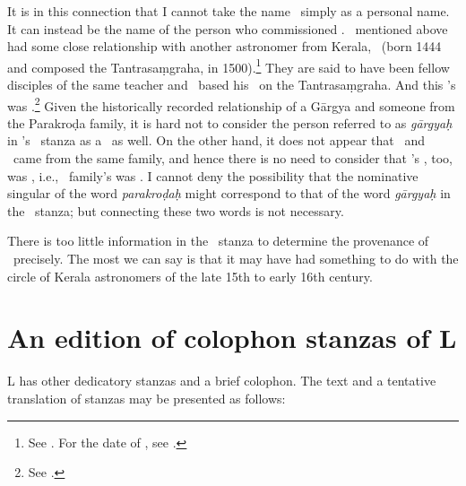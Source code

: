 It is in this connection that I cannot take the name \Gargya\ simply as a personal name. It can instead be the \gotra{} name of the person who commissioned \Tm. \Jyesthadeva\ mentioned above had some close relationship with another astronomer from Kerala, \NilakanthaSomayaji\ (born 1444 and composed the Tantrasaṃgraha, in 1500).\footnote{See \citet[187–8]{kvsarma:1991}. For the date of \NilakanthaSomayaji, see \citet[S 3]{sarmaandnarasimhan:tantrasangraha}.} They are said to have been fellow disciples of the same teacher and \Jyesthadeva\ based his \Yuktibhasa\ on the Tantrasaṃgraha. And this \NilakanthaSomayaji's \gotra{} was \Gargya.\footnote{See \citet[S 1]{sarmaandnarasimhan:tantrasangraha}.} Given the historically recorded relationship of a Gārgya and someone from the Parakroḍa family, it is hard not to consider the person referred to as \emph{gārgyaḥ} in \Tm's \colophon\ stanza as a \Gargya\ as well. On the other hand, it does not appear that \Jyesthadeva\ and \NilakanthaSomayaji\ came from the same family, and hence there is no need to consider that \Jyesthadeva's \gotra{}, too, was \Gargya, i.e., \Parakroda\ family's \gotra{} was \Gargya. I cannot deny the possibility that the nominative singular of the word \emph{parakroḍaḥ} might correspond to that of the word \emph{gārgyaḥ} in the \colophon\ stanza; but connecting these two words is not necessary.

There is too little information in the \colophon\ stanza to determine the provenance of \Tm\ precisely. The most we can say is that it may have had something to do with the circle of Kerala astronomers of the late 15th to early 16th century.


\section{An edition of colophon stanzas of L}\label{LCOL0405}
L has other dedicatory stanzas and a brief colophon. The text and a tentative translation of stanzas may be presented as follows:
 
